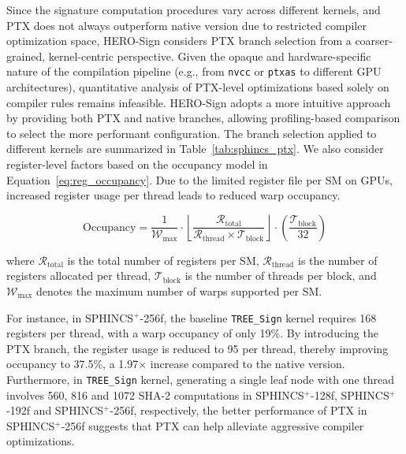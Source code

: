 \documentclass[10pt,conference]{IEEEtran}
\begin{document}
Since the signature computation procedures vary across different kernels, and PTX does not always outperform native version due to restricted compiler optimization space, HERO-Sign considers PTX branch selection from a coarser-grained, kernel-centric perspective. Given the opaque and hardware-specific nature of the compilation pipeline (e.g., from \texttt{nvcc} or \texttt{ptxas} to different GPU architectures), quantitative analysis of PTX-level optimizations based solely on compiler rules remains infeasible. HERO-Sign adopts a more intuitive approach by providing both PTX and native branches, allowing profiling-based comparison to select the more performant configuration. The branch selection applied to different kernels are summarized in Table~\ref{tab:sphincs_ptx}. We also consider register-level factors based on the occupancy model in Equation~\ref{eq:reg_occupancy}. Due to the limited register file per SM on GPUs, increased register usage per thread leads to reduced warp occupancy.


\begin{equation}
\text{Occupancy} = \frac{1}{\mathcal{W}_{\max}} \cdot 
\left\lfloor 
\frac{\mathcal{R}_{\mathrm{total}}}{\mathcal{R}_{\mathrm{thread}} \times \mathcal{T}_{\mathrm{block}}} 
\right\rfloor 
\cdot \left( \frac{\mathcal{T}_{\mathrm{block}}}{32} \right)
\label{eq:reg_occupancy}
\end{equation}

\noindent
where $\mathcal{R}_{\mathrm{total}}$ is the total number of registers per SM, $\mathcal{R}_{\mathrm{thread}}$ is the number of registers allocated per thread, $\mathcal{T}_{\mathrm{block}}$ is the number of threads per block, and $\mathcal{W}_{\max}$ denotes the maximum number of warps supported per SM.



For instance, in  SPHINCS$^+$-256f, the baseline \texttt{TREE\_Sign} kernel requires 168 registers per thread, with a warp occupancy of only 19\%. By introducing the PTX branch, the register usage is reduced to 95 per thread, thereby improving occupancy to 37.5\%, a 1.97$\times$ increase compared to the native version. Furthermore, in \texttt{TREE\_Sign} kernel, generating a single leaf node with one thread involves 560, 816 and 1072 SHA-2 computations in SPHINCS$^+$-128f, SPHINCS$^+$-192f and SPHINCS$^+$-256f, respectively, the better performance of PTX in SPHINCS$^+$-256f suggests that PTX can help alleviate aggressive compiler optimizations.
\end{document}
